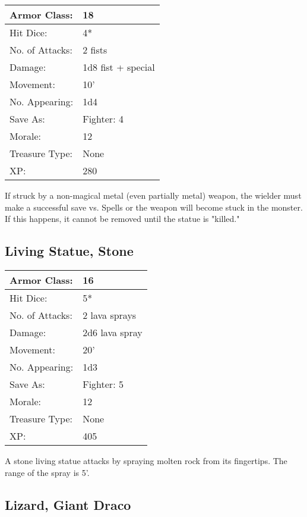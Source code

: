 \documentclass[a4paper,twoside,openany,10pt]{book}
\begin{document}
\begin{multicols}{2}
\begin{tabularx}{0.50\textwidth}{@{}lX@{}}
Armor Class: & 18 \\\hline
Hit Dice: & 4* \\\hline
No. of Attacks: & 2 fists \\\hline
Damage: & 1d8 fist + special \\\hline
Movement: & 10' \\\hline
No. Appearing: & 1d4 \\\hline
Save As: & Fighter: 4 \\\hline
Morale: & 12 \\\hline
Treasure Type: & None \\\hline
XP: & 280 \\\hline
\end{tabularx}\medskip

If struck by a non-magical metal (even partially metal) weapon, the wielder must make a successful save vs. Spells or the weapon will become stuck in the monster. If this happens, it cannot be removed until the statue is "killed."

\subsection*{Living Statue, Stone}\label{living-statue-stone}

\begin{tabularx}{0.50\textwidth}{@{}lX@{}}
Armor Class: & 16 \\\hline
Hit Dice: & 5* \\\hline
No. of Attacks: & 2 lava sprays \\\hline
Damage: & 2d6 lava spray \\\hline
Movement: & 20' \\\hline
No. Appearing: & 1d3 \\\hline
Save As: & Fighter: 5 \\\hline
Morale: & 12 \\\hline
Treasure Type: & None \\\hline
XP: & 405 \\\hline
\end{tabularx}\medskip

A stone living statue attacks by spraying molten rock from its fingertips. The range of the spray is 5'.

\subsection*{Lizard, Giant Draco}\label{lizard-giant-draco}


\end{multicols}
\end{document}
